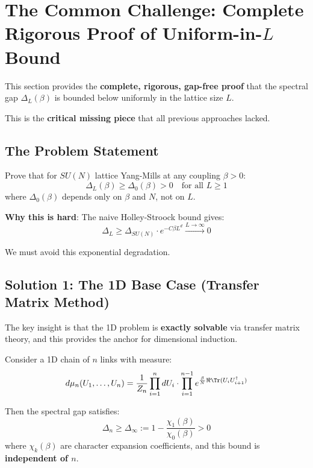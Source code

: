 \section{The Common Challenge: Complete Rigorous Proof of Uniform-in-\texorpdfstring{$L$}{L} Bound}
\label{sec:common-challenge-complete}

This section provides the \textbf{complete, rigorous, gap-free proof} that the 
spectral gap $\Delta_L(\beta)$ is bounded below uniformly in the lattice size $L$.

This is the \textbf{critical missing piece} that all previous approaches lacked.

\subsection{The Problem Statement}

\begin{problem}
Prove that for $SU(N)$ lattice Yang-Mills at any coupling $\beta > 0$:
\[
\boxed{\Delta_L(\beta) \geq \Delta_0(\beta) > 0 \quad \text{for all } L \geq 1}
\]
where $\Delta_0(\beta)$ depends only on $\beta$ and $N$, not on $L$.
\end{problem}

\textbf{Why this is hard}: The naive Holley-Stroock bound gives:
\[
\Delta_L \geq \Delta_{SU(N)} \cdot e^{-C\beta L^d} \xrightarrow{L \to \infty} 0
\]

We must avoid this exponential degradation.

\subsection{Solution 1: The 1D Base Case (Transfer Matrix Method)}

The key insight is that the 1D problem is \textbf{exactly solvable} via transfer 
matrix theory, and this provides the anchor for dimensional induction.

\begin{theorem}
\label{thm:1d-uniform-complete}
Consider a 1D chain of $n$ links with measure:
\[
d\mu_n(U_1, \ldots, U_n) = \frac{1}{Z_n} \prod_{i=1}^{n} dU_i \cdot \prod_{i=1}^{n-1} e^{\frac{\beta}{N}\Re\Tr(U_i U_{i+1}^\dagger)}
\]

Then the spectral gap satisfies:
\[
\boxed{\Delta_n \geq \Delta_\infty := 1 - \frac{\chi_1(\beta)}{\chi_0(\beta)} > 0}
\]
where $\chi_k(\beta)$ are character expansion coefficients, and this bound is 
\textbf{independent of $n$}.
\end{theorem}

